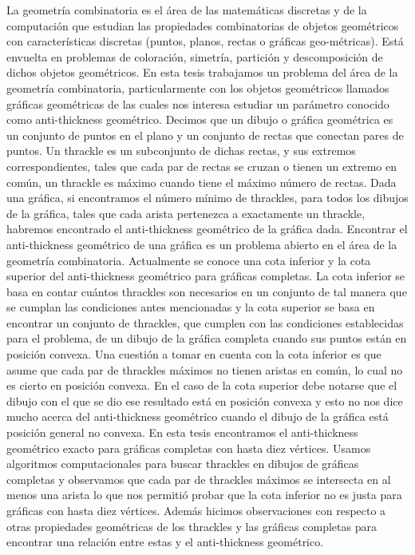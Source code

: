 La geometría combinatoria es el área de las matemáticas discretas y de la computación que estudian las
propiedades combinatorias de objetos geométricos con características discretas (puntos, planos, rectas o
gráficas geo\hyp métricas). Está envuelta en problemas de coloración, simetría, partición y descomposición
de dichos objetos geométricos. En esta tesis trabajamos un problema del área de la geometría combinatoria,
particularmente con los objetos geométricos llamados gráficas geométricas de las cuales nos interesa estudiar
un parámetro conocido como anti-thickness geométrico. Decimos que un dibujo o gráfica geométrica es un
conjunto de puntos en el plano y un conjunto de rectas que conectan pares de puntos. Un thrackle es un
subconjunto de dichas rectas, y sus extremos correspondientes, tales que cada par de rectas se cruzan o
tienen un extremo en común, un thrackle es máximo cuando tiene el máximo número de rectas. Dada una gráfica,
si encontramos el número mínimo de thrackles, para todos los dibujos de la gráfica, tales que cada arista
pertenezca a exactamente un thrackle, habremos encontrado el anti-thickness geométrico de la gráfica dada.
Encontrar el anti-thickness geométrico de una gráfica es un problema abierto en el área de la geometría
combinatoria. Actualmente se conoce una cota inferior y la cota superior del anti-thickness
geométrico para gráficas completas. La cota inferior se basa en contar cuántos thrackles son
necesarios en un conjunto de tal manera que se cumplan las condiciones antes mencionadas y la cota superior
se basa en encontrar un conjunto de thrackles, que cumplen con las condiciones establecidas para el problema,
de un dibujo de la gráfica completa cuando sus puntos están en posición convexa. Una cuestión a tomar en
cuenta con la cota inferior es que asume que cada par de thrackles máximos no tienen aristas en común, lo
cual no es cierto en posición convexa. En el caso de la cota superior debe notarse que el dibujo con el que
se dio ese resultado está en posición convexa y esto no nos dice mucho acerca del anti-thickness geométrico
cuando el dibujo de la gráfica está posición general no convexa. En esta tesis encontramos el
anti-thickness geométrico exacto para gráficas completas con hasta diez vértices. Usamos algoritmos
computacionales para buscar thrackles en dibujos de gráficas completas y observamos que cada par de
thrackles máximos se intersecta en al menos una arista lo que nos permitió probar que la cota inferior no
es justa para gráficas con hasta diez vértices. Además hicimos observaciones con respecto a otras
propiedades geométricas de los thrackles y las gráficas completas para encontrar una relación entre estas y
el anti-thickness geométrico.

